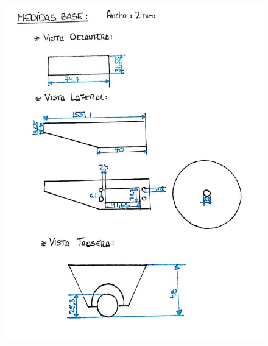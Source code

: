 \begin{figure}[ht!]
\begin{minipage}{0.45\linewidth}
		\includegraphics[width=\linewidth]{figs/cap5/planos2.jpeg}
		\caption*{\centering}
	\end{minipage}
	\hspace{1cm}
	\begin{minipage}{0.45\linewidth}
		\centering

\end{minipage}
\end{figure}
